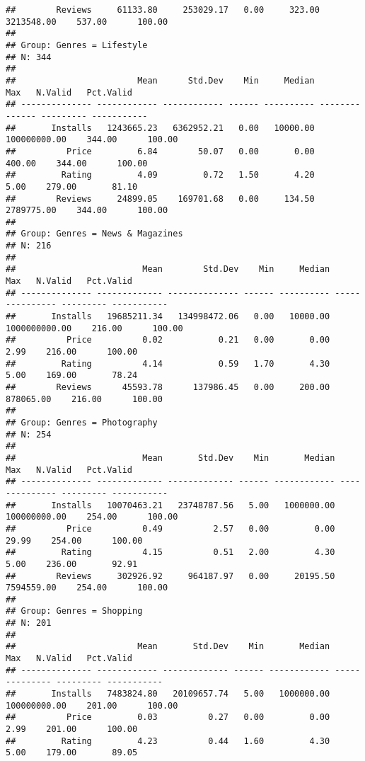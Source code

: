 \documentclass[
]{article}
\begin{document}
\begin{verbatim}
##        Reviews     61133.80     253029.17   0.00     323.00     3213548.00    537.00      100.00
## 
## Group: Genres = Lifestyle  
## N: 344  
## 
##                        Mean      Std.Dev    Min     Median            Max   N.Valid   Pct.Valid
## -------------- ------------ ------------ ------ ---------- -------------- --------- -----------
##       Installs   1243665.23   6362952.21   0.00   10000.00   100000000.00    344.00      100.00
##          Price         6.84        50.07   0.00       0.00         400.00    344.00      100.00
##         Rating         4.09         0.72   1.50       4.20           5.00    279.00       81.10
##        Reviews     24899.05    169701.68   0.00     134.50     2789775.00    344.00      100.00
## 
## Group: Genres = News & Magazines  
## N: 216  
## 
##                         Mean        Std.Dev    Min     Median             Max   N.Valid   Pct.Valid
## -------------- ------------- -------------- ------ ---------- --------------- --------- -----------
##       Installs   19685211.34   134998472.06   0.00   10000.00   1000000000.00    216.00      100.00
##          Price          0.02           0.21   0.00       0.00            2.99    216.00      100.00
##         Rating          4.14           0.59   1.70       4.30            5.00    169.00       78.24
##        Reviews      45593.78      137986.45   0.00     200.00       878065.00    216.00      100.00
## 
## Group: Genres = Photography  
## N: 254  
## 
##                         Mean       Std.Dev    Min       Median            Max   N.Valid   Pct.Valid
## -------------- ------------- ------------- ------ ------------ -------------- --------- -----------
##       Installs   10070463.21   23748787.56   5.00   1000000.00   100000000.00    254.00      100.00
##          Price          0.49          2.57   0.00         0.00          29.99    254.00      100.00
##         Rating          4.15          0.51   2.00         4.30           5.00    236.00       92.91
##        Reviews     302926.92     964187.97   0.00     20195.50     7594559.00    254.00      100.00
## 
## Group: Genres = Shopping  
## N: 201  
## 
##                        Mean       Std.Dev    Min       Median            Max   N.Valid   Pct.Valid
## -------------- ------------ ------------- ------ ------------ -------------- --------- -----------
##       Installs   7483824.80   20109657.74   5.00   1000000.00   100000000.00    201.00      100.00
##          Price         0.03          0.27   0.00         0.00           2.99    201.00      100.00
##         Rating         4.23          0.44   1.60         4.30           5.00    179.00       89.05

\end{verbatim}
\end{document}

